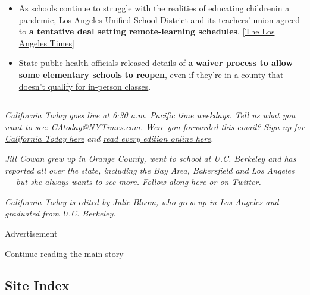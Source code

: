 \begin{itemize}
\item
  As schools continue to
  \href{https://www.nytimes3xbfgragh.onion/2020/08/03/us/school-closing-coronavirus.html?}{struggle
  with the realities of educating children}in a pandemic, Los Angeles
  Unified School District and its teachers' union agreed to \textbf{a
  tentative deal setting remote-learning schedules}.
  {[}\href{https://www.latimes.com/california/story/2020-08-03/lausd-teachers-reach-tentative-online-learning-pact}{The
  Los Angeles Times}{]}
\item
  State public health officials released details of \textbf{a}
  \textbf{\href{https://www.cdph.ca.gov/Programs/CID/DCDC/Pages/COVID-19/Schools-FAQ.aspx}{waiver
  process to allow some elementary schools}} \textbf{to reopen}, even if
  they're in a county that
  \href{https://www.nytimes3xbfgragh.onion/2020/07/17/us/california-schools-reopening-newsom.html}{doesn't
  qualify for in-person classes}.
\end{itemize}

\begin{center}\rule{0.5\linewidth}{\linethickness}\end{center}

\emph{California Today goes live at 6:30 a.m. Pacific time weekdays.
Tell us what you want to see:}
\href{mailto:CAtoday@NYTimes.com}{\emph{CAtoday@NYTimes.com}}\emph{.
Were you forwarded this email?}
\href{https://www.nytimes3xbfgragh.onion/newsletters/california-today?module=inline}{\emph{Sign
up for California Today here}} \emph{and}
\href{https://www.nytimes3xbfgragh.onion/column/california-today}{\emph{read
every edition online here}}\emph{.}

\emph{Jill Cowan grew up in Orange County, went to school at U.C.
Berkeley and has reported all over the state, including the Bay Area,
Bakersfield and Los Angeles --- but she always wants to see more. Follow
along here or on}
\href{https://twitter.com/JillCowan}{\emph{Twitter}}\emph{.}

\emph{California Today is edited by Julie Bloom, who grew up in Los
Angeles and graduated from U.C. Berkeley.}

Advertisement

\protect\hyperlink{after-bottom}{Continue reading the main story}

\hypertarget{site-index}{%
\subsection{Site Index}\label{site-index}}

